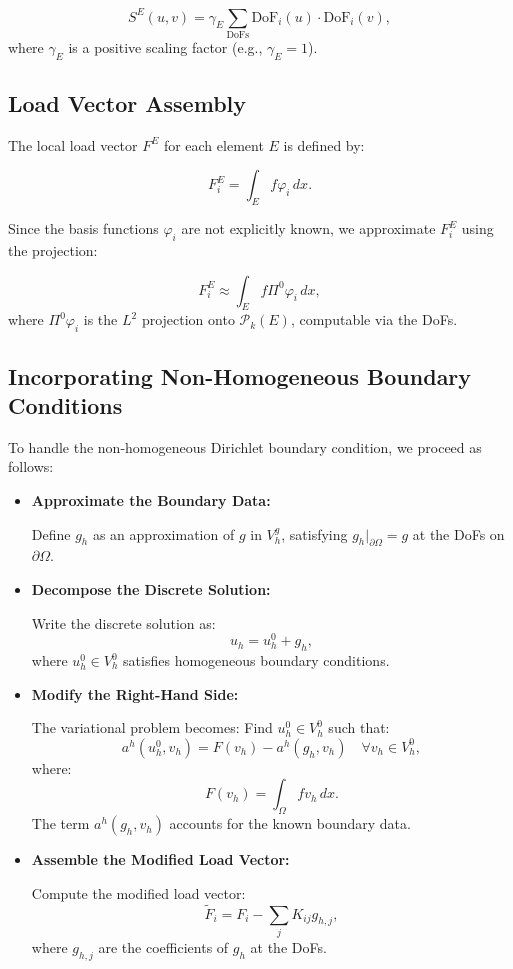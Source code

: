 \documentclass[class=article, crop=false]{standalone}
\begin{document}
\[
S^E(u, v) = \gamma_E \sum_{\text{DoFs}} \text{DoF}_i(u) \cdot \text{DoF}_i(v),
\]
where $\gamma_E$ is a positive scaling factor (e.g., $\gamma_E = 1$).

\subsection{Load Vector Assembly}

The local load vector $F^E$ for each element $E$ is defined by:

\[
F^E_i = \int_E f \varphi_i \, dx.
\]

Since the basis functions $\varphi_i$ are not explicitly known, we approximate $F^E_i$ using the projection:

\[
F^E_i \approx \int_E f \Pi^0 \varphi_i \, dx,
\]
where $\Pi^0 \varphi_i$ is the $L^2$ projection onto $\mathcal{P}_k(E)$, computable via the DoFs.

\subsection{Incorporating Non-Homogeneous Boundary Conditions}

To handle the non-homogeneous Dirichlet boundary condition, we proceed as follows:

\begin{itemize}
    \item \textbf{Approximate the Boundary Data:}

    Define $g_h$ as an approximation of $g$ in $V_h^g$, satisfying $g_h|_{\partial\Omega} = g$ at the DoFs on $\partial\Omega$.

    \item \textbf{Decompose the Discrete Solution:}

    Write the discrete solution as:
    \[
    u_h = u_h^0 + g_h,
    \]
    where $u_h^0 \in V_h^0$ satisfies homogeneous boundary conditions.

    \item \textbf{Modify the Right-Hand Side:}

    The variational problem becomes: Find $u_h^0 \in V_h^0$ such that:
    \[
    a^h(u_h^0, v_h) = F(v_h) - a^h(g_h, v_h) \quad \forall v_h \in V_h^0,
    \]
    where:
    \[
    F(v_h) = \int_{\Omega} f v_h \, dx.
    \]
    The term $a^h(g_h, v_h)$ accounts for the known boundary data.

    \item \textbf{Assemble the Modified Load Vector:}

    Compute the modified load vector:
    \[
    \tilde{F}_i = F_i - \sum_{j} K_{ij} g_{h,j},
    \]
    where $g_{h,j}$ are the coefficients of $g_h$ at the DoFs.
\end{itemize}
\end{document}
